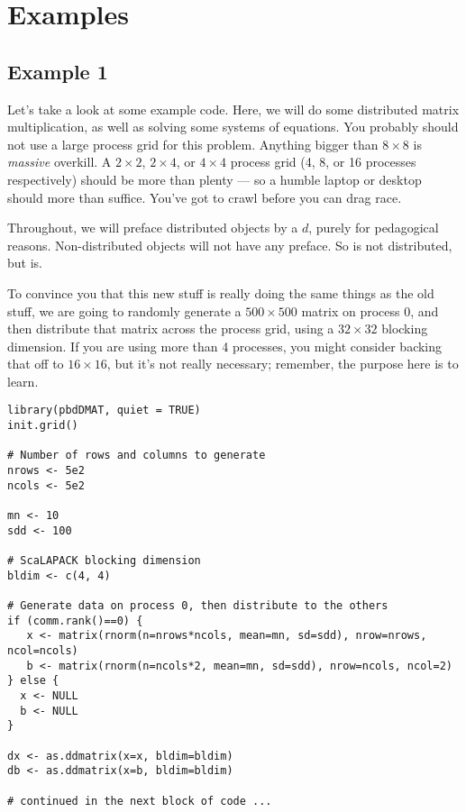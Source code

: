 \section[]{Examples}\label{sec:eg1}






\subsection[]{Example 1}

Let's take a look at some example code.  Here, we will do some distributed matrix multiplication, as well as solving some systems of equations.  You probably should not use a large process grid for this problem.  Anything bigger than $8\times 8$ is \emph{massive} overkill.  A $2\times 2$, $2\times 4$, or $4\times 4$ process grid (4, 8, or 16 processes respectively) should be more than plenty --- so a humble laptop or desktop should more than suffice.  You've got to crawl before you can drag race.

Throughout, we will preface distributed objects by a $d$, purely for pedagogical reasons.  Non-distributed objects will not have any preface.  So  is not distributed, but  is.

To convince you that this new stuff is really doing the same things as the old stuff, we are going to randomly generate a $500\times 500$ matrix on process 0, and then distribute that matrix across the process grid, using a $32\times 32$ blocking dimension.  If you are using more than 4 processes, you might consider backing that off to $16\times 16$, but it's not really necessary; remember, the purpose here is to learn.

\begin{lstlisting}[language=rr,title=Generating Test Data]
library(pbdDMAT, quiet = TRUE)
init.grid() 

# Number of rows and columns to generate
nrows <- 5e2
ncols <- 5e2

mn <- 10
sdd <- 100

# ScaLAPACK blocking dimension
bldim <- c(4, 4)

# Generate data on process 0, then distribute to the others
if (comm.rank()==0) {
   x <- matrix(rnorm(n=nrows*ncols, mean=mn, sd=sdd), nrow=nrows, ncol=ncols)
   b <- matrix(rnorm(n=ncols*2, mean=mn, sd=sdd), nrow=ncols, ncol=2)
} else {
  x <- NULL  
  b <- NULL
}

dx <- as.ddmatrix(x=x, bldim=bldim)
db <- as.ddmatrix(x=b, bldim=bldim)

# continued in the next block of code ...
\end{lstlisting}

